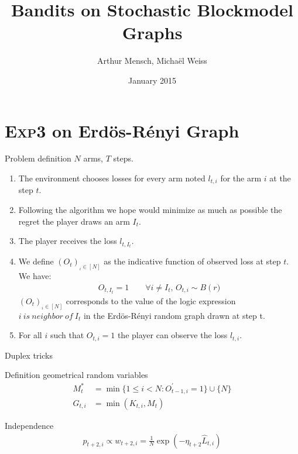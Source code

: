 \documentclass[11pt]{beamer}
\author{Arthur Mensch, Michaël Weiss}
\title{Bandits on Stochastic Blockmodel Graphs}
\institute{Reinforcement Learning}
\date{January 2015}
\begin{document}
\begin{frame}
\titlepage
\end{frame}

\section{\textsc{Exp3} on Erdös-Rényi Graph}
\begin{frame}{Problem definition}
$N$ arms, $T$ steps.
\begin{enumerate}
\item The environment chooses losses for every arm noted $l_{t,i}$ for the arm $i$ at the step $t$.
\item Following the algorithm we hope would minimize as much as possible the regret the player draws an arm $I_t$.
\item The player receives the loss $l_{t,I_t}$.
\item We define $\left(O_t\right)_{_i\in\left[N\right]}$ as the indicative function of observed loss at step $t$. We have:
\begin{align*}
O_{t,I_t}=1 \qquad \forall i \neq I_t,\, O_{t,i} \sim B\left(r\right.)
\end{align*}
$\left(O_t\right)_{_i\in\left[N\right]}$ corresponds to the value of the logic expression $ i \ is\ neighbor\ of\ I_t$ in the Erdös-Rényi random graph drawn at step t.
\item For all $i$ such that $O_{t,i}=1$ the player can observe the loss $l_{t,i}$.
\end{enumerate}
\end{frame}

\begin{frame}{Duplex tricks}
\begin{block}{Definition geometrical random variables}
\begin{align*}
M_t^* &=\min\{1\leq i<N: O_{t-1,i}^{'} =1\}\cup\{N\}\\
G_{t,i}&=\min\left(K_{t,i},M_t\right)
\end{align*}
\end{block}
\begin{block}{Independence}
\begin{align*}
p_{t+2,i}\propto w_{t+2,i}= \frac{1}{N} \exp\left( -\eta_{t+2} \hat{L}_{t,i} \right)
\end{align*}
\end{block}
\end{frame}
\end{document}
